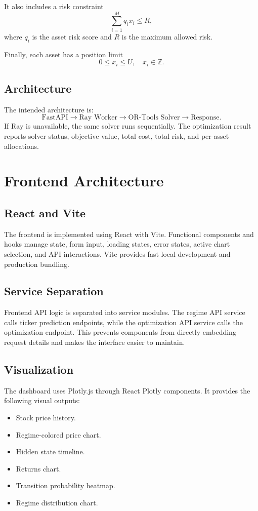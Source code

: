\documentclass[conference]{IEEEtran}
\begin{document}
It also includes a risk constraint
\begin{equation}
    \sum_{i=1}^{M} q_i x_i \leq R,
\end{equation}
where $q_i$ is the asset risk score and $R$ is the maximum allowed risk.

Finally, each asset has a position limit
\begin{equation}
    0 \leq x_i \leq U, \quad x_i \in \mathbb{Z}.
\end{equation}

\subsection{Architecture}
The intended architecture is:
\begin{equation}
    \text{FastAPI} \rightarrow \text{Ray Worker} \rightarrow \text{OR-Tools Solver} \rightarrow \text{Response}.
\end{equation}
If Ray is unavailable, the same solver runs sequentially. The optimization result reports solver status, objective value, total cost, total risk, and per-asset allocations.

\section{Frontend Architecture}
\subsection{React and Vite}
The frontend is implemented using React with Vite. Functional components and hooks manage state, form input, loading states, error states, active chart selection, and API interactions. Vite provides fast local development and production bundling.

\subsection{Service Separation}
Frontend API logic is separated into service modules. The regime API service calls ticker prediction endpoints, while the optimization API service calls the optimization endpoint. This prevents components from directly embedding request details and makes the interface easier to maintain.

\subsection{Visualization}
The dashboard uses Plotly.js through React Plotly components. It provides the following visual outputs:
\begin{itemize}
    \item Stock price history.
    \item Regime-colored price chart.
    \item Hidden state timeline.
    \item Returns chart.
    \item Transition probability heatmap.
    \item Regime distribution chart.
\end{itemize}
\end{document}
